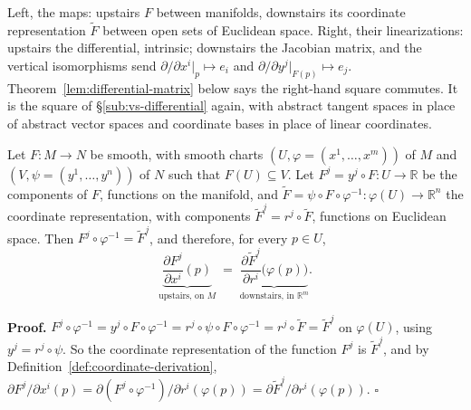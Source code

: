 \documentclass[11pt]{report}
\makeatletter
\newcounter{thmcounter}[section]
\renewenvironment{proof}[1][Proof]{\noindent\textbf{#1.} }{\hfill$\square$\par\vspace{5pt}}
\newcommand{\thmlabel}[1]{\edef\@currentlabel{\arabic{section}.\arabic{thmcounter}}\label{#1}}
\makeatother
\begin{document}
Left, the maps: upstairs $F$ between manifolds, downstairs its coordinate representation $\tilde F$ between open sets of Euclidean space. Right, their linearizations: upstairs the differential, intrinsic; downstairs the Jacobian matrix, and the vertical isomorphisms send $\partial/\partial x^i|_p \mapsto e_i$ and $\partial/\partial y^j|_{F(p)} \mapsto e_j$. Theorem~\ref{lem:differential-matrix} below says the right-hand square commutes. It is the square of \S\ref{sub:vs-differential} again, with abstract tangent spaces in place of abstract vector spaces and coordinate bases in place of linear coordinates.

\begin{propbox}\thmlabel{prop:upstairs-downstairs}
Let $F : M \to N$ be smooth, with smooth charts $(U, \varphi = (x^1, \ldots, x^m))$ of $M$ and $(V, \psi = (y^1, \ldots, y^n))$ of $N$ such that $F(U) \subseteq V$. Let $F^j = y^j \circ F : U \to \mathbb{R}$ be the components of $F$, functions on the manifold, and $\tilde F = \psi \circ F \circ \varphi^{-1} : \varphi(U) \to \mathbb{R}^n$ the coordinate representation, with components $\tilde F^j = r^j \circ \tilde F$, functions on Euclidean space. Then $F^j \circ \varphi^{-1} = \tilde F^j$, and therefore, for every $p \in U$,
\[
\underbrace{\frac{\partial F^j}{\partial x^i}(p)}_{\text{upstairs, on } M} \;=\; \underbrace{\frac{\partial \tilde F^j}{\partial r^i}\big(\varphi(p)\big)}_{\text{downstairs, in } \mathbb{R}^m} .
\]
\end{propbox}

\begin{proof}
$F^j \circ \varphi^{-1} = y^j \circ F \circ \varphi^{-1} = r^j \circ \psi \circ F \circ \varphi^{-1} = r^j \circ \tilde F = \tilde F^j$ on $\varphi(U)$, using $y^j = r^j \circ \psi$. So the coordinate representation of the function $F^j$ is $\tilde F^j$, and by Definition~\ref{def:coordinate-derivation}, $\partial F^j/\partial x^i(p) = \partial (F^j \circ \varphi^{-1})/\partial r^i(\varphi(p)) = \partial \tilde F^j/\partial r^i(\varphi(p))$.
\end{proof}
\end{document}
